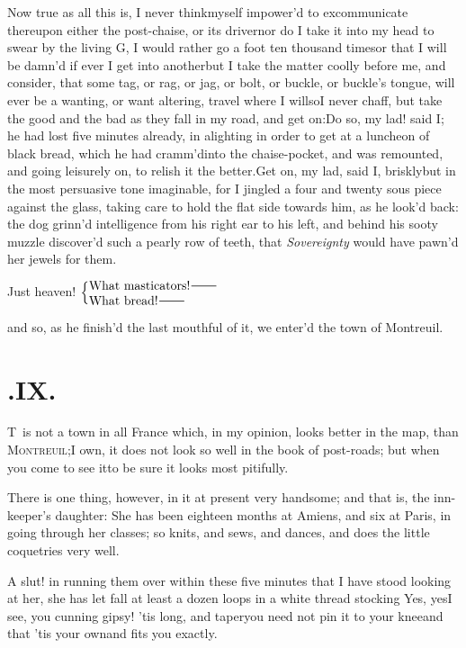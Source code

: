 \documentclass{article}
\begin{document}
Now true as all this is, I never think\break myself impower’d to
excommunicate thereupon either the post-chaise, or its
driver\tsh nor do I take it into my head to swear by the
living G\tsk, I would rather go a foot ten thousand
times\tsh or that I will be damn’d if ever I get
into another\tsh but I take the matter coolly
before me, and consider, that some tag, or rag, or jag, or bolt, or
buckle, or buckle’s tongue, will ever be a wanting, or want
altering, travel where I will\tsk so\break I never chaff, but take the
good and the bad as they fall in my road, and get
on:\tsh Do so, my lad! said I; he had lost five minutes
already, in alighting in order to get at a luncheon of black bread,
which he had cramm’d\break into the chaise-pocket, and was
remounted, and going leisurely on, to relish it the
better.\tsh Get on, my lad, said I, briskly\tsk but in
the most persuasive tone imaginable, for I jingled a
four and twenty sous piece against the glass, taking care to hold
the flat side towards him, as he look’d back: the dog
grinn’d intelligence from his right ear to his left, and
behind his sooty muzzle discover’d such a pearly row of teeth, that
\textit{Sovereignty} would have pawn’d her jewels for
them.\tsh

\noindent
Just heaven! $\displaystyle\left\{\vcenter{\halign{#\hss\cr What masticators!\tsh\cr What bread!\tsh\cr}}\right.$

\noindent
and so, as he finish’d the last mouthful of it, we
enter’d the town of Montreuil.

\vfill{}\eject
\section{.\enspace IX.}

\lettrine{T}{\,} is not a town in all France which, in my opinion, looks better in the
map, than \textsc{Montreuil};\tsh I own, it does not look so well in the book of
post-roads; but when you come to see it\tsk to be sure it looks most pitifully.

There is one thing, however, in it at present very handsome; and that is, the
inn-keeper’s daughter: She has been eighteen months at Amiens, and six at
Paris, in going through her classes; so knits, and sews, and dances, and
does the little coquetries very well.\tsh

\tsk A slut! in running them over with\-in these five minutes
that I have stood looking at her, she has let fall at least a dozen
loops in a white thread stocking\break
\tsh Yes, yes\tsk I see, you cunning gipsy!\break
\tsk ’tis long, and taper\tsk you need
not pin it to your knee\tsk and that ’tis your
own\tsk and fits you exactly.\tsh
\end{document}
